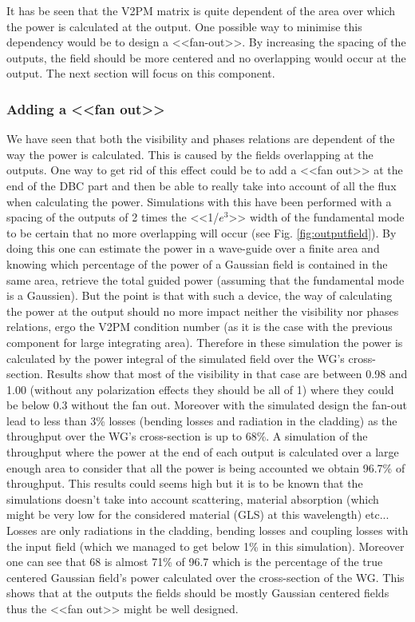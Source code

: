 It has be seen that the V2PM matrix is quite dependent of the area
over which the power is calculated at the output. One possible way to
minimise this dependency would be to design a <<fan-out>>. By
increasing the spacing of the outputs, the field should be more
centered and no overlapping would occur at the output. The next section
will focus on this component.

\subsubsection{Adding a <<fan out>>}
We have seen that both the visibility and phases relations are
dependent of the way the power is calculated. This is caused by the
fields overlapping at the outputs. One way to get rid of this effect
could be to add a <<fan out>> at the end of the DBC part and then be able to really take into account of all the flux when calculating the power. Simulations
with this have been performed with a spacing of the outputs of 2 times
the <<1/$e^3$>> width of the fundamental mode to be certain that no
more overlapping will occur (see Fig. \ref{fig:outputfield}). By doing this one can estimate the
power in a wave-guide over a finite area and knowing which percentage
of the power of a Gaussian field is contained in the same area,
retrieve the total guided power (assuming that the fundamental mode is a Gaussien). But the point is that with such a
device, the way of calculating the power at the output should no more
impact neither the visibility nor phases relations, ergo the V2PM condition number (as it is the case with the previous component for large integrating area).
Therefore in these simulation the power is calculated by the power
integral of the simulated field over the WG's cross-section.
Results show that most of the visibility in that case are between
0.98 and 1.00 (without any polarization effects they should be all of
1) where they could be below 0.3 without the fan out.
Moreover with the simulated design the fan-out lead to less than 3\%
losses (bending losses and radiation in the cladding) as the
throughput over the WG's cross-section is up to 68\%.
A simulation of the throughput where the power at the end of each
output is calculated over a large enough area to consider that all the
power is being accounted we obtain 96.7\% of throughput. This results
could seems high but it is to be known that the simulations doesn't
take into account scattering, material absorption (which might be very
low for the considered material (GLS) at this wavelength) etc... Losses are only radiations in
the cladding, bending losses and coupling losses with the input field
(which we managed to get below 1\% in this simulation).
Moreover one can see that 68 is almost 71\% of 96.7 which is the
percentage of the true centered Gaussian field's power calculated over
the cross-section of the WG. This shows that at the outputs the fields
should be mostly Gaussian centered fields thus the <<fan out>> might be well designed.

